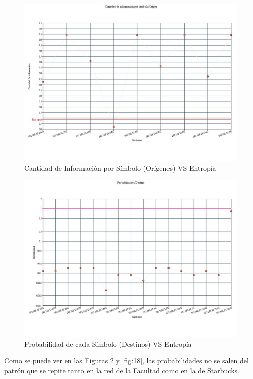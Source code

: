 \begin{figure}[H]
  \centering
    \includegraphics[scale=0.45]{imagenes/graficos/entropiaCantInf/06Origen.jpg}
  \caption{Cantidad de Información por Símbolo (Orígenes) VS Entropía}
  \label{fig:16}
\end{figure}

\begin{figure}[H]
  \centering
    \includegraphics[scale=0.45]{imagenes/graficos/Probabilidades/06destino.jpg}
  \caption{Probabilidad de cada Símbolo (Destinos) VS Entropía}
  \label{fig:17}
\end{figure}

Como se puede ver en las Figuras \ref{fig:17} y \ref{fig:18}, las probabilidades no se salen del patrón que se repite tanto en la red de la Facultad como en la de Starbucks.

